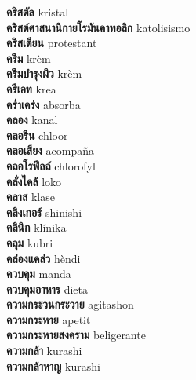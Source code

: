\textbf{ คริสตัล  } kristal \\
\textbf{ คริสต์ศาสนานิกายโรมันคาทอลิก  } katolisismo \\
\textbf{ คริสเตียน  } protestant \\
\textbf{ ครีม  } krèm \\
\textbf{ ครีมบำรุงผิว  } krèm \\
\textbf{ ครีเอท  } krea \\
\textbf{ คร่ำเคร่ง  } absorba \\
\textbf{ คลอง  } kanal \\
\textbf{ คลอรีน  } chloor \\
\textbf{ คลอเสียง  } acompaña \\
\textbf{ คลอโรฟีลล์  } chlorofyl \\
\textbf{ คลั่งไคล้  } loko \\
\textbf{ คลาส  } klase \\
\textbf{ คลิงเกอร์  } shinishi \\
\textbf{ คลินิก  } klínika \\
\textbf{ คลุม  } kubri \\
\textbf{ คล่องแคล่ว  } hèndi \\
\textbf{ ควบคุม  } manda \\
\textbf{ ควบคุมอาหาร  } dieta \\
\textbf{ ความกระวนกระวาย  } agitashon \\
\textbf{ ความกระหาย  } apetit \\
\textbf{ ความกระหายสงคราม  } beligerante \\
\textbf{ ความกล้า  } kurashi \\
\textbf{ ความกล้าหาญ  } kurashi \\
